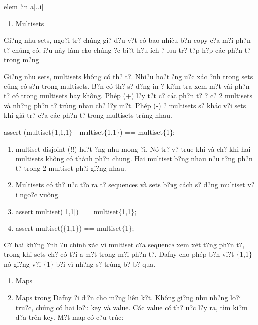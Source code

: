 \documentclass{article} %
\begin{document}
elem !in a[..i]

\begin{enumerate}
\item  Multisets
\end{enumerate}

Gi?ng nhu sets, ngo?i tr? ch\'{u}ng gi? d?u v?t c\'{o} bao nhi\^{e}u b?n copy c?a m?i ph?n t? ch\'{u}ng c\'{o}. {\DJ}i?u n\`{a}y l\`{a}m cho ch\'{u}ng {\dj}?c bi?t h?u \'{i}ch {\dj}? luu tr? t?p h?p c\'{a}c ph?n t? trong m?ng

Gi?ng nhu sets, multisets kh\^{o}ng c\'{o} th? t?. Nhi?u ho?t {\dj}?ng {\dj}u?c x\'{a}c {\dj}?nh trong sets c\~{u}ng c\'{o} s?n trong multisets. B?n c\'{o} th? s? d?ng in {\dj}? ki?m tra xem m?t v\`{a}i ph?n t? c\'{o} trong multisets hay kh\^{o}ng. Ph\'{e}p (+) l?y t?t c? c\'{a}c ph?n t? ? c? 2 multisets v\`{a} nh?ng ph?n t? tr\`{u}ng nhau ch? l?y m?t. Ph\'{e}p (-) ? multisets s? kh\'{a}c v?i sets khi gi\'{a} tr? c?a c\'{a}c ph?n t? trong multisets tr\`{u}ng nhau.

\noindent assert (multiset$\{$1,1,1$\}$ - multiset$\{$1,1$\}$) == multiset$\{$1$\}$;

\begin{enumerate}
\item  multiset disjoint (!!) ho?t {\dj}?ng nhu mong {\dj}?i. N\'{o} tr? v? true khi v\`{a} ch? khi hai multisets kh\^{o}ng c\'{o} th\`{a}nh ph?n chung. Hai multiset b?ng nhau n?u t?ng ph?n t? trong 2 multiset ph?i gi?ng nhau.

\item  Multisets c\'{o} th? {\dj}u?c t?o ra t? sequences v\`{a} sets b?ng c\'{a}ch s? d?ng multiset v?i ngo?c vu\^{o}ng.

\item  assert multiset([1,1]) == multiset$\{$1,1$\}$;

\item  assert multiset($\{$1,1$\}$) == multiset$\{$1$\}$;
\end{enumerate}

C? hai kh?ng {\dj}?nh {\dj}?u ch\'{i}nh x\'{a}c v\`{i} multiset c?a sequence xem x\'{e}t t?ng ph?n t?, trong khi sets ch? c\'{o} t?i {\dj}a m?t trong m?i ph?n t?. Dafny cho ph\'{e}p b?n vi?t $\{$1,1$\}$ n\'{o} gi?ng v?i $\{$1$\}$ b?i v\`{i} nh?ng s? tr\`{u}ng b? b? qua.

\begin{enumerate}
\item  Maps

\item  Maps trong Dafny {\dj}?i di?n cho m?ng li\^{e}n k?t. Kh\^{o}ng gi?ng nhu nh?ng lo?i tru?c, ch\'{u}ng c\'{o} hai lo?i: key v\`{a} value. C\'{a}c value c\'{o} th? {\dj}u?c l?y ra, t\`{i}m ki?m d?a tr\^{e}n key. M?t map c\'{o} c?u tr\'{u}c:
\end{enumerate}
\end{document}
